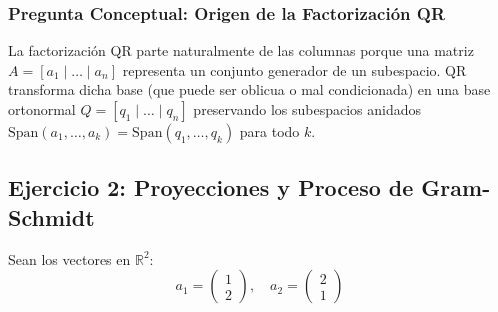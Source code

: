 \documentclass[11pt,a4paper]{article}
\theoremstyle{definition}
\theoremstyle{remark}
\begin{document}
\subsubsection{Pregunta Conceptual: Origen de la Factorización QR}
La factorización QR parte naturalmente de las columnas porque una matriz $A = [a_1 \mid \dots \mid a_n]$ representa un conjunto generador de un subespacio. QR transforma dicha base (que puede ser oblicua o mal condicionada) en una base ortonormal $Q = [q_1 \mid \dots \mid q_n]$ preservando los subespacios anidados $\text{Span}(a_1, \dots, a_k) = \text{Span}(q_1, \dots, q_k)$ para todo $k$.

\subsection{Ejercicio 2: Proyecciones y Proceso de Gram-Schmidt}
Sean los vectores en $\mathbb{R}^2$:
\begin{equation}
    a_1 = \begin{pmatrix} 1 \\ 2 \end{pmatrix}, \quad a_2 = \begin{pmatrix} 2 \\ 1 \end{pmatrix}
\end{equation}
\end{document}

